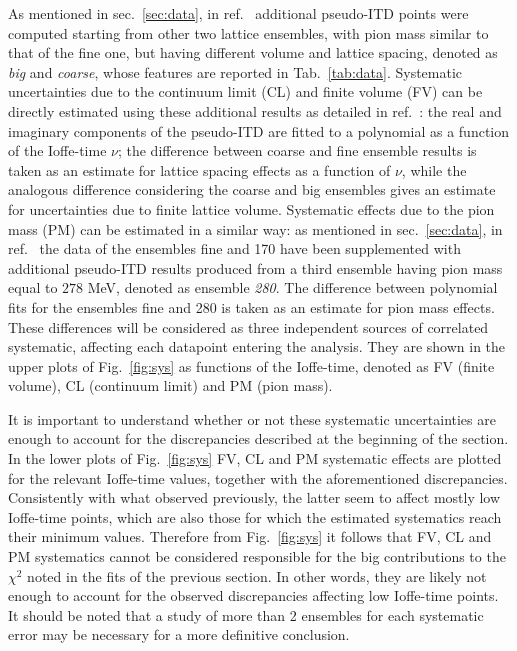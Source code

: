 %
As mentioned in sec.~\ref{sec:data},
in ref.~\cite{Joo:2019jct} additional pseudo-ITD points were computed starting
from other two lattice ensembles, with pion mass similar to that of the fine one, but having different volume and lattice spacing, 
denoted as \textit{big} and \textit{coarse}, whose features are reported in Tab.~\ref{tab:data}.
%
Systematic uncertainties due to the continuum limit (CL) and finite volume (FV) can be directly estimated using 
these additional results as detailed in ref.~\cite{Joo:2019jct}: the real and imaginary components 
of the pseudo-ITD are fitted to a polynomial as a function of the Ioffe-time $\nu$; 
the difference between coarse and fine ensemble results is taken
as an estimate for lattice spacing effects as a function of $\nu$, while the analogous difference 
considering the coarse and big ensembles gives an estimate for uncertainties due to finite lattice volume.
%
Systematic effects due to the pion mass (PM) can be estimated in a similar way: 
as mentioned in sec.~\ref{sec:data}, in ref.~\cite{Joo:2020spy} the data of the ensembles fine and 170 have been supplemented with
additional pseudo-ITD results produced from a third ensemble having pion mass equal to $278$ MeV, denoted as ensemble
\textit{280}.  
The difference between polynomial fits for the ensembles fine and 280 is taken as an estimate for pion mass effects.
%
These differences will be considered as three independent sources of correlated systematic, affecting each datapoint
entering the analysis. 
They are shown in the upper plots of Fig.~\ref{fig:sys} as functions of the Ioffe-time, denoted as FV (finite volume),
CL (continuum limit) and PM (pion mass).

%
It is important to understand whether or not these systematic uncertainties are enough to
account for the discrepancies described at the beginning of the section.
In the lower plots of Fig.~\ref{fig:sys} FV, CL and PM systematic effects are plotted for the relevant Ioffe-time values, 
together with the aforementioned discrepancies. 
Consistently with what observed previously, the latter seem to affect mostly low Ioffe-time points, 
which are also those for which the estimated systematics reach their minimum values.
Therefore from Fig.~\ref{fig:sys} it follows that FV, CL and PM systematics cannot be considered responsible 
for the big contributions to the $\chi^2$ noted in the fits of the previous section. 
In other words, they are likely not enough to account for the observed discrepancies 
affecting low Ioffe-time points.
It should be noted that a study of more than 2 ensembles for each systematic error may be necessary for a more definitive conclusion.

